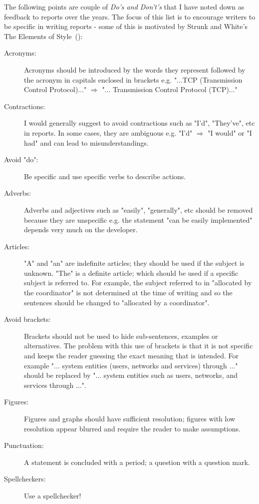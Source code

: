 \documentclass{article}
\begin{document}
The following points are couple of {\it Do's and Don't's} that I have noted down as feedback to reports over the years. The focus of this list is to encourage writers to be specific in writing reports - some of this is motivated by Strunk and White's The Elements of Style~(\cite{strunk}):

\begin{description}
	\item [Acronyms:] Acronyms should be introduced by the words they represent followed by the acronym in capitals enclosed in brackets e.g. "...TCP (Transmission Control Protocol)..." $\Rightarrow$  "... Transmission Control Protocol (TCP)..."
	\item [Contractions:] I would generally suggest to avoid contractions such as "I'd", "They've", etc in reports. In some cases, they are ambiguous e.g. "I'd" $\Rightarrow$ "I would" or "I had" and can lead to misunderstandings.
	\item [Avoid "do":] Be specific and use specific verbs to describe actions.
	\item [Adverbs:] Adverbs and adjectives such as "easily", "generally", etc should be removed because they are unspecific e.g. the statement "can be easily implemented" depends very much on the developer. 
	\item [Articles:] "A" and "an" are indefinite articles; they should be used if the subject is unknown. "The" is a definite article; which should be used if a specific subject is referred to. For example, the subject referred to in "allocated by the coordinator" is not determined at the time of writing and so the sentences should be changed to "allocated by a coordinator".
	\item [Avoid brackets:] Brackets should not be used to hide sub-sentences, examples or alternatives. The problem with this use of brackets is that it is not specific and keeps the reader guessing the exact meaning that is intended. For example "... system entities (users, networks and services) through ..." should be replaced by "... system entities such as users, networks, and services through ...".
	\item [Figures:] Figures and graphs should have sufficient resolution; figures with low resolution appear blurred and require the reader to make assumptions.
	\item [Punctuation:] A statement is concluded with a period; a question with a question mark. 
	\item [Spellcheckers:] Use a spellchecker!
\end{description}
\end{document}
